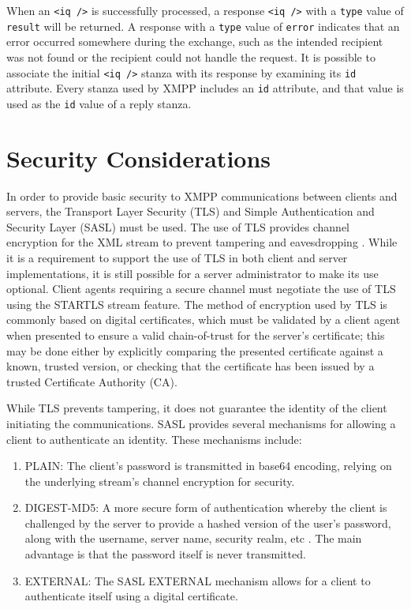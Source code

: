 When an \texttt{<iq />} is successfully processed, a response \texttt{<iq />}
with a \texttt{type} value of \texttt{result} will be returned. A response
with a \texttt{type} value of \texttt{error} indicates that an error occurred
somewhere during the exchange, such as the intended recipient was not found or
the recipient could not handle the request. It is possible to associate the
initial \texttt{<iq />} stanza with its response by examining its \texttt{id}
attribute. Every stanza used by XMPP includes an \texttt{id} attribute, and that
value is used as the \texttt{id} value of a reply stanza.

\section{Security Considerations}
\label{sec:Security-Considerations}

In order to provide basic security to XMPP communications between clients and
servers, the Transport Layer Security (TLS) \cite{TLS} and Simple Authentication
and Security Layer (SASL) \cite{SASL} must be used. The use of TLS provides
channel encryption for the XML stream to prevent tampering and eavesdropping
\cite{RFC3920}. While it is a requirement to support the use of TLS in
both client and server implementations, it is still possible for a server
administrator to make its use optional. Client agents requiring a secure
channel must negotiate the use of TLS using the STARTLS \cite{RFC3920} stream
feature. The method of encryption used by TLS is commonly based on digital
certificates, which must be validated by a client agent when presented to ensure
a valid chain-of-trust for the server's certificate; this may be done either by
explicitly comparing the presented certificate against a known, trusted version,
or checking that the certificate has been issued by a trusted Certificate
Authority (CA).

While TLS prevents tampering, it does not guarantee the identity of the client
initiating the communications. SASL provides several mechanisms for allowing
a client to authenticate an identity. These mechanisms include:
\begin{enumerate}
\item PLAIN: The client's password is transmitted in base64 encoding, relying
on the underlying stream's channel encryption for security.
\item DIGEST-MD5: A more secure form of authentication whereby the client is
challenged by the server to provide a hashed version of the user's password,
along with the username, server name, security realm, etc \cite{RFC2831}. The
main advantage is that the password itself is never transmitted.
\item EXTERNAL: The SASL EXTERNAL mechanism allows for a client to authenticate
itself using a digital certificate.
\end{enumerate}

